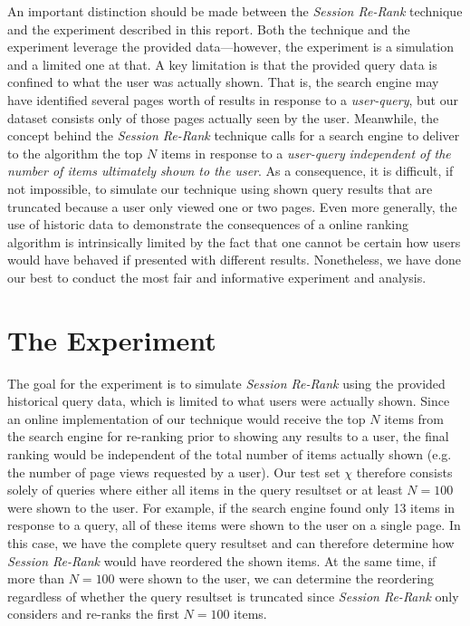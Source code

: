 \documentclass{article}
\begin{document}
An important distinction should be made between the {\em Session Re-Rank}
technique and the experiment described in this report. Both the technique and
the experiment leverage the provided data---however, the experiment is
a simulation and a limited one at that. A key limitation is that the provided
query data is confined to what the user was actually shown. That is, the search
engine may have identified several pages worth of results in response to a {\em
user-query}, but our dataset consists only of those pages actually seen by the user.
Meanwhile, the concept behind the {\em Session Re-Rank} technique calls for a
search engine to deliver to the algorithm the top $N$ items in response to a
{\em user-query} {\em independent of the number of items ultimately shown to the
user}. As a consequence, it is difficult, if not impossible, to simulate our technique using shown
query results that are truncated because a user only viewed one or two pages. 
Even more generally, the use of historic data to demonstrate the consequences of a 
online ranking algorithm is intrinsically limited by the fact that one cannot be certain 
how users would have behaved if presented with different results. Nonetheless, 
we have done our best to conduct the most fair and informative experiment and 
analysis.

\section{The Experiment}

The goal for the experiment is to simulate {\em Session Re-Rank} using the
provided historical query data, which is limited to what users were actually
shown. Since an online implementation of our technique would receive the top $N$
items from the search engine for re-ranking prior to showing any results to a
user, the final ranking would be independent of the total number of items
actually shown (e.g. the number of page views requested by a user). Our test 
set $\chi$ therefore consists solely of queries where either all items in the
query resultset or at least $N=100$ were shown to the user. For example, if
the search engine found only 13 items in response to a query, all of these
items were shown to the user on a single page. In this case, we have the
complete query resultset and can therefore determine how {\em Session Re-Rank}
would have reordered the shown items. At the same time, if more than $N=100$
were shown to the user, we can determine the reordering regardless of whether
the query resultset is truncated since {\em Session Re-Rank} only considers
and re-ranks the first $N=100$ items.
\end{document}
